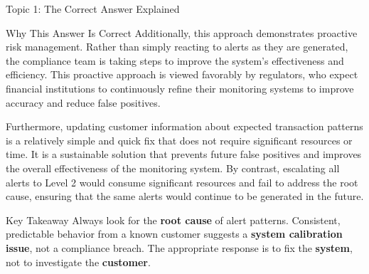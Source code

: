 \documentclass[8pt]{beamer}  %
\begin{document}
\begin{frame}{Topic 1: The Correct Answer Explained}
\begin{block}{\large Why This Answer Is Correct}
			Additionally, this approach demonstrates proactive risk management. Rather than simply reacting to alerts as they are generated, the compliance team is taking steps to improve the system's effectiveness and efficiency. This proactive approach is viewed favorably by regulators, who expect financial institutions to continuously refine their monitoring systems to improve accuracy and reduce false positives.
			
			Furthermore, updating customer information about expected transaction patterns is a relatively simple and quick fix that does not require significant resources or time. It is a sustainable solution that prevents future false positives and improves the overall effectiveness of the monitoring system. By contrast, escalating all alerts to Level 2 would consume significant resources and fail to address the root cause, ensuring that the same alerts would continue to be generated in the future.
		\end{block}
		
		\begin{alertblock}{Key Takeaway}
			Always look for the \textbf{root cause} of alert patterns. Consistent, predictable behavior from a known customer suggests a \textbf{system calibration issue}, not a compliance breach. The appropriate response is to fix the \textbf{system}, not to investigate the \textbf{customer}.
		\end{alertblock}
	\end{frame}
	
\end{document}
